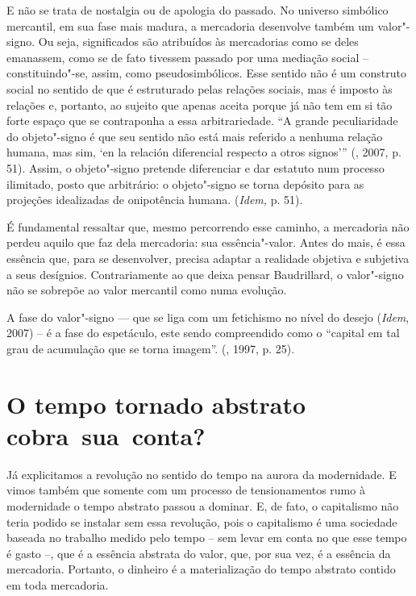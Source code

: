 {E não se trata de nostalgia ou de apologia do passado. No universo
simbólico mercantil, em sua fase mais madura, a mercadoria desenvolve
também um valor"-signo. Ou seja, significados são atribuídos às
mercadorias como se deles emanassem, como se de fato tivessem passado
por uma mediação social -- constituindo"-se, assim, como
pseudosimbólicos. Esse sentido não é um construto social no sentido de
que é estruturado pelas relações sociais, mas é imposto às relações e,
portanto, ao sujeito que apenas aceita porque já não tem em si tão forte
espaço que se contraponha a essa arbitrariedade. ``A grande
peculiaridade do objeto"-signo é que seu sentido não está mais referido a
nenhuma relação humana, mas sim, `en la relación diferencial respecto a
otros signos''' (, 2007, p. 51). Assim, o objeto"-signo pretende
diferenciar e dar estatuto num processo ilimitado, posto que arbitrário:
o objeto"-signo se torna depósito para as projeções idealizadas de
onipotência humana. (\emph{Idem,} p. 51).

É fundamental ressaltar que, mesmo percorrendo esse caminho, a
mercadoria não perdeu aquilo que faz dela mercadoria: sua
essência"-valor. Antes do mais, é essa essência que, para se desenvolver,
precisa adaptar a realidade objetiva e subjetiva a seus desígnios.
Contrariamente ao que deixa pensar Baudrillard, o valor"-signo não se
sobrepõe ao valor mercantil como numa evolução.

A fase do valor"-signo --- que se liga com um fetichismo no nível do
desejo (\emph{Idem}, 2007) -- é a fase do espetáculo, este sendo
compreendido como o ``capital em tal grau de acumulação que se torna
imagem''. (, 1997, p. 25).

\section{O tempo tornado abstrato cobra~sua~conta?}

Já explicitamos a revolução no sentido do tempo na aurora da
modernidade. E vimos também que somente com um processo de
tensionamentos rumo à modernidade o tempo abstrato passou a dominar. E,
de fato, o capitalismo não teria podido se instalar sem essa revolução,
pois o capitalismo é uma sociedade baseada no trabalho medido pelo tempo
-- sem levar em conta no que esse tempo é gasto --, que é a essência
abstrata do valor, que, por sua vez, é a essência da mercadoria.
Portanto, o dinheiro é a materialização do tempo abstrato contido em
toda mercadoria.

}
